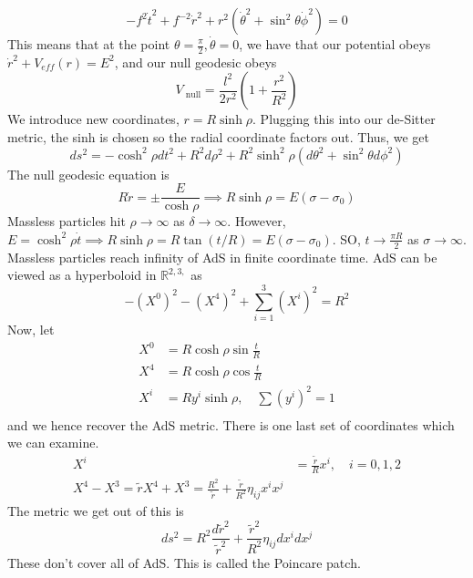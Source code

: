 \[
	- f ^ 2 \dot{ t} ^ 2 + f ^{ - 2 } \dot{ r } ^ 2 + 
	r^ 2 \left(  \dot{ \theta } ^ 2 + \sin ^ 2 \theta \dot{ \phi } ^ 2    \right)  = 0 
\] This means that 
at the point $ \theta = \frac{ \pi }{ 2 } , \dot{ \theta } = 0  $, 
we have that our potential obeys $ \dot{ r } ^ 2 + V_{ eff } ( r) 
 = E^ 2 $, and our null geodesic obeys 
 \[
	 V_{ \text{ null} } = \frac{ l ^ 2 }{ 2 r ^ 2 } \left(  
	 1 + \frac{ r ^ 2 }{ R ^ 2}\right) 
 \] We introduce new coordinates, $ r = R \sinh \rho $. 
 Plugging this into our de-Sitter metric, the sinh is 
 chosen so the radial coordinate factors out. 
 Thus, we get 
  \[
  d s^ 2 = - \cosh ^ 2 \rho d t ^ 2 +  R^ 2  d \rho ^ 2 
  + R ^ 2 \sinh ^ 2 \rho ( d \theta ^ 2 + \sin ^ 2 \theta d \phi ^ 2 ) 
 \] The null geodesic equation is 
 \[
  R \dot{ r }  = \pm \frac{E }{ \cosh \rho } \implies 
  R \sinh \rho  = E ( \sigma - \sigma _{ 0 } ) 
 \]  
 Massless particles hit $ \rho \to \infty$ as $ \delta \to \infty$.
 However, $ E = \cosh^ 2 \rho \dot{ t } \implies R \sinh \rho  = 
 R \tan \left(  t / R  \right)   = E ( \sigma - \sigma _ 0 ) $. 
 SO, $ t \to \frac{ \pi R }{ 2 } $ as $ \sigma \to \infty $. 
 Massless particles reach infinity of AdS in finite coordinate time. 
 AdS can be viewed as a hyperboloid in $ \mathbb{ R} ^{ 2, 3, } $ 
 as \[
	 -( X ^ 0 ) ^ 2 - ( X ^ 4 ) ^ 2 + \sum_{ i = 1 } ^ 3 ( X ^ i ) ^  2 = R^ 2
 \] Now, let
 \begin{align*}
 	X ^ 0 &=  R \cosh \rho \sin \frac{ t }{ R  }  \\ 
	X ^ 4 &=  R \cosh \rho \cos \frac{ t }{R }  \\
	X ^ i &=  R y ^ i \sinh \rho , \quad \sum ( y ^ i ) ^ 2 = 1 \\
 \end{align*} 
 and we hence recover the AdS metric. 
 There is one last set of coordinates which we can 
 examine. 
 \begin{align*}
 	X^ i &=  \frac{ \tilde{ r }  }{ R } x ^ i , \quad i = 0, 1, 2   \\
	X^ 4 - X ^ 3 = \tilde{ r } 
	X^ 4 + X ^ 3  = \frac{ R ^ 2 }{ \tilde{ r } } + \frac{ \tilde{ r }  }{ 
	R ^ 2 } \eta_{ ij }  x^ i x ^ j 
 \end{align*}
 The metric we get out of this is 
 \[
  d s^ 2 = R ^ 2 \frac{d \tilde{ r } ^ 2  }{ \tilde{ r } ^ 2  } 
  + \frac{ \tilde{r } ^ 2  }{R ^ 2  } \eta_{ ij }dx ^ i dx ^ j 
 \]  These don't cover all of AdS. This is called the Poincare patch. 

